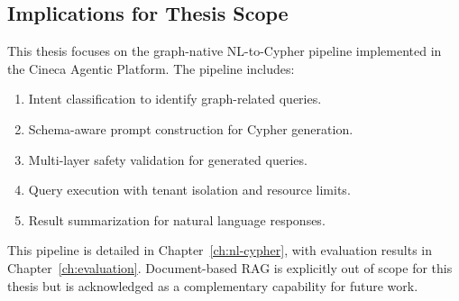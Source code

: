 \subsection{Implications for Thesis Scope}

This thesis focuses on the graph-native NL-to-Cypher pipeline implemented in the Cineca Agentic Platform. The pipeline includes:

\begin{enumerate}
    \item Intent classification to identify graph-related queries.
    \item Schema-aware prompt construction for Cypher generation.
    \item Multi-layer safety validation for generated queries.
    \item Query execution with tenant isolation and resource limits.
    \item Result summarization for natural language responses.
\end{enumerate}

This pipeline is detailed in Chapter~\ref{ch:nl-cypher}, with evaluation results in Chapter~\ref{ch:evaluation}. Document-based RAG is explicitly out of scope for this thesis but is acknowledged as a complementary capability for future work.
